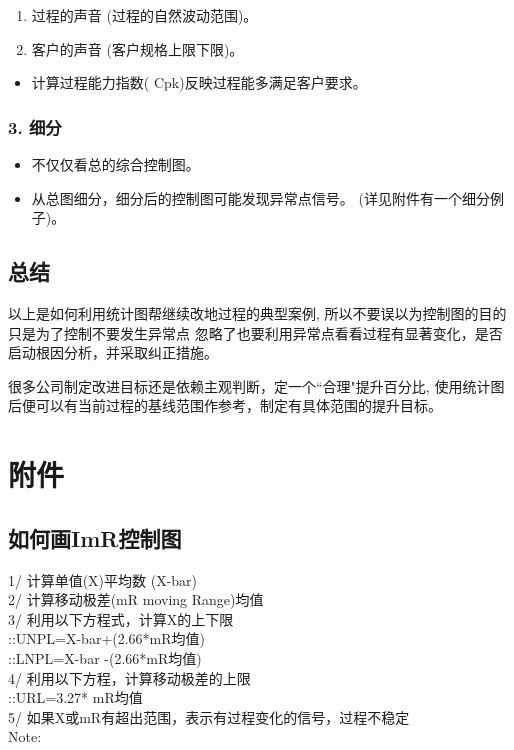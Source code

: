 \begin{enumerate}
\tightlist
\item
  过程的声音 (过程的自然波动范围)。
\item
  客户的声音 (客户规格上限下限)。
\end{enumerate}

\begin{itemize}
\tightlist
\item
  计算过程能力指数( Cpk)反映过程能多满足客户要求。
\end{itemize}

\hypertarget{ux7ec6ux5206}{%
\subsubsection{3. 细分}\label{ux7ec6ux5206}}

\begin{itemize}
\tightlist
\item
  不仅仅看总的综合控制图。
\item
  从总图细分，细分后的控制图可能发现异常点信号。
  (详见附件有一个细分例子)。
\end{itemize}

\hypertarget{ux603bux7ed3}{%
\subsection{总结}\label{ux603bux7ed3}}

以上是如何利用统计图帮继续改地过程的典型案例,
所以不要误以为控制图的目的只是为了控制不要发生异常点
忽略了也要利用异常点看看过程有显著变化，是否启动根因分析，并采取纠正措施。

很多公司制定改进目标还是依赖主观判断，定一个``合理"提升百分比,
使用统计图后便可以有当前过程的基线范围作参考，制定有具体范围的提升目标。

\hypertarget{ux9644ux4ef6}{%
\section{附件}\label{ux9644ux4ef6}}

\hypertarget{ux5982ux4f55ux753bimrux63a7ux5236ux56fe}{%
\subsection{如何画ImR控制图}\label{ux5982ux4f55ux753bimrux63a7ux5236ux56fe}}

1/ 计算单值(X)平均数 (X-bar)\\
2/ 计算移动极差(mR moving Range)均值\\
3/ 利用以下方程式，计算X的上下限\\
::UNPL=X-bar+(2.66*mR均值)\\
::LNPL=X-bar -(2.66*mR均值)\\
4/ 利用以下方程，计算移动极差的上限\\
::URL=3.27* mR均值\\
5/ 如果X或mR有超出范围，表示有过程变化的信号，过程不稳定\\
Note:

